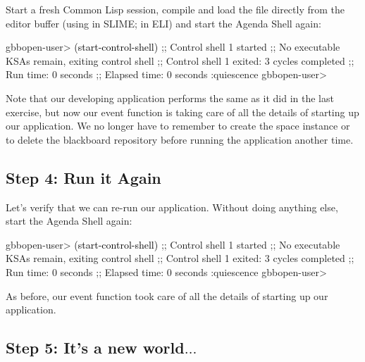 \documentclass[10pt,twoside,english,pdftex]{article}
\begin{document}
%
%
Start a fresh Common Lisp session, compile and load the
 file directly from the editor buffer
(using  in SLIME;  in ELI) and start
the Agenda Shell again:
%
\W\supp
\begin{example}
\textcolor{darkergray}{%
  gbbopen-user> \textcolor{black}{(start-control-shell)}
  ;; Control shell 1 started
  ;; No executable KSAs remain, exiting control shell
  ;; Control shell 1 exited: 3 cycles completed
  ;; Run time: 0 seconds
  ;; Elapsed time: 0 seconds
  :quiescence
  gbbopen-user>}
\end{example}

Note that our developing application performs the same as it did in the last
exercise, but now our  event function is taking
care of all the details of starting up our application.  We no longer have to
remember to create the  space instance or to delete
the blackboard repository before running the application another time.

\subsection*{Step 4: Run it Again}

%
%
Let's verify that we can re-run our application. Without doing anything else,
start the Agenda Shell again:
%
\W\supp
\begin{example}
\textcolor{darkergray}{%
  gbbopen-user> \textcolor{black}{(start-control-shell)}
  ;; Control shell 1 started
  ;; No executable KSAs remain, exiting control shell
  ;; Control shell 1 exited: 3 cycles completed
  ;; Run time: 0 seconds
  ;; Elapsed time: 0 seconds
  :quiescence
  gbbopen-user>}
\end{example}

As before, our  event function took care of all
the details of starting up our application.

\subsection*{Step 5: It's a new world$\ldots$}
\end{document}
